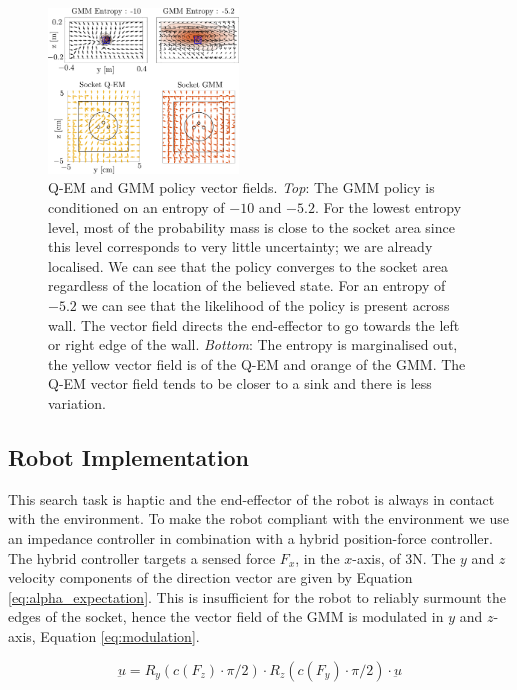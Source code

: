 \documentclass[final,5p,times,twocolumn]{elsarticle}
\begin{document}
\begin{figure}
   \includegraphics[width=0.45\textwidth]{./Figures/Fig/policy_vf.pdf}
  \caption{Q-EM and GMM policy vector fields. \textit{Top}: The GMM policy is conditioned on an entropy of $-10$ and $-5.2$. For the lowest entropy level,
  most of the probability mass is close to the socket area since this level corresponds to very little uncertainty; we are already localised. We can see 
  that the policy converges to the socket area regardless of the location of the believed state. For an entropy of $-5.2$ we can see that 
  the likelihood of the policy is present across wall. The vector field directs the end-effector to go towards the left or right edge of the wall. 
  \textit{Bottom}: The entropy is marginalised out, the yellow vector field is of the Q-EM and orange of the GMM. The Q-EM vector field tends 
  to be closer to a sink and there is less variation.}
  \label{fig:policy_vf}
\end{figure}

\subsection{Robot Implementation}


This search task is haptic and the end-effector of the robot is always in contact with the environment. To make the robot
compliant with the environment we use an impedance controller in combination with a hybrid position-force controller. The hybrid controller
targets a sensed force $F_x$, in the $x$-axis, of 3N. The $y$ and $z$ velocity components of the direction vector are given by 
Equation \ref{eq:alpha_expectation}. This is insufficient for the robot to reliably surmount the edges of the socket,
hence the vector field of the GMM is modulated in $y$ and $z$-axis, Equation \ref{eq:modulation}.

\begin{equation}
  \underbar{u} = R_y(c(F_z) \cdot \pi/2) \cdot R_z(c(F_y) \cdot \pi/2) \cdot \underbar{u} \label{eq:modulation}
\end{equation}
\end{document}
